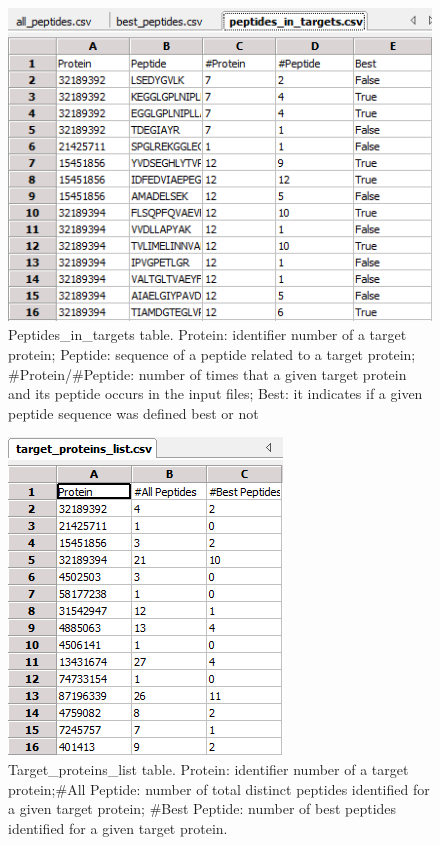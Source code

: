 \documentclass[a4paper,14pt]{extarticle}
\begin{document}
\begin{figure}[htbp]
\begin{center}
\includegraphics[scale=0.8]{Eppi_peptides_in_targets}
\caption{Peptides\_in\_targets table. Protein: identifier number of a target protein; Peptide: sequence of a peptide related to a target protein; \#Protein/\#Peptide: number of times that a given target protein and its peptide occurs in the input files;  Best: it indicates if a given peptide sequence was defined best or not }
\end{center}
\end{figure}

\begin{figure}[htbp]
\begin{center}
\includegraphics[scale=0.8]{Eppi_target_proteins_list}
\caption{Target\_proteins\_list table. Protein: identifier number of a target protein;\#All Peptide: number of total distinct peptides identified for a given target protein; \#Best Peptide: number of best peptides identified for a given target protein.}\label{fig:targetProtTable}
\end{center}
\end{figure}
\end{document}
